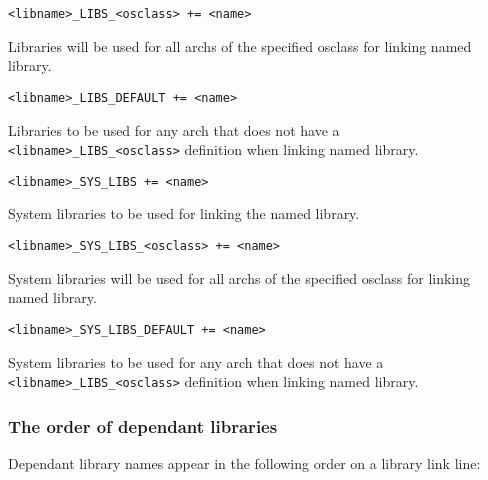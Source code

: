 \begin{description}
\item \verb|<libname>_LIBS_<osclass> += <name>|

Libraries will be used for all archs of the specified osclass for linking named library.

\item \verb|<libname>_LIBS_DEFAULT += <name>|

Libraries to be used for any arch that does not have a \verb|<libname>_LIBS_<osclass>| definition when linking 
named library.

\item

\item {}\verb|<libname>_SYS_LIBS += <name>|

System libraries to be used for linking the named library.

\item \verb|<libname>_SYS_LIBS_<osclass> += <name>|

System libraries will be used for all archs of the specified osclass for linking named library.

\item \verb|<libname>_SYS_LIBS_DEFAULT += <name>|

System libraries to be used for any arch that does not have a \verb|<libname>_LIBS_<osclass>| definition when linking named library.

\end{description}

\subsubsection{The order of dependant libraries}

Dependant library names appear in the following order on a library link line:

